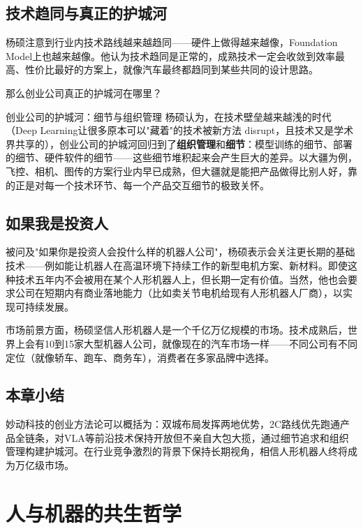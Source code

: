 \documentclass[a4paper]{article}
\begin{document}
\subsection{技术趋同与真正的护城河}

杨硕注意到行业内技术路线越来越趋同——硬件上做得越来越像，Foundation Model上也越来越像。他认为技术趋同是正常的，成熟技术一定会收敛到效率最高、性价比最好的方案上，就像汽车最终都趋同到某些共同的设计思路。

那么创业公司真正的护城河在哪里？

\begin{importantbox}{创业公司的护城河：细节与组织管理}
杨硕认为，在技术壁垒越来越浅的时代（Deep Learning让很多原本可以"藏着"的技术被新方法 disrupt，且技术又是学术界共享的），创业公司的护城河回归到了\textbf{组织管理}和\textbf{细节}：模型训练的细节、部署的细节、硬件软件的细节——这些细节堆积起来会产生巨大的差异。以大疆为例，飞控、相机、图传的方案行业内早已成熟，但大疆就是能把产品做得比别人好，靠的正是对每一个技术环节、每一个产品交互细节的极致关怀。
\end{importantbox}

\subsection{如果我是投资人}

被问及"如果你是投资人会投什么样的机器人公司"，杨硕表示会关注更长期的基础技术——例如能让机器人在高温环境下持续工作的新型电机方案、新材料。即使这种技术五年内不会被用在某个人形机器人上，但长期一定有价值。当然，他也会要求公司在短期内有商业落地能力（比如卖关节电机给现有人形机器人厂商），以实现可持续发展。

市场前景方面，杨硕坚信人形机器人是一个千亿万亿规模的市场。技术成熟后，世界上会有10到15家大型机器人公司，就像现在的汽车市场一样——不同公司有不同定位（就像轿车、跑车、商务车），消费者在多家品牌中选择。

\subsection{本章小结}

妙动科技的创业方法论可以概括为：双城布局发挥两地优势，2C路线优先跑通产品全链条，对VLA等前沿技术保持开放但不亲自大包大揽，通过细节追求和组织管理构建护城河。在行业竞争激烈的背景下保持长期视角，相信人形机器人终将成为万亿级市场。


\section{人与机器的共生哲学}
\end{document}
